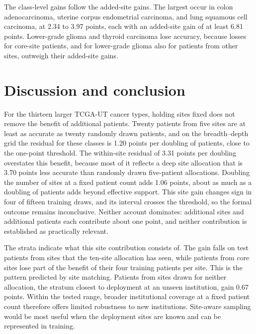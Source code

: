 \noindent The class-level gains follow the added-site gains. The largest occur in colon adenocarcinoma, uterine corpus endometrial carcinoma, and lung squamous cell carcinoma, at 2.34 to 3.97 points, each with an added-site gain of at least 6.81 points. Lower-grade glioma and thyroid carcinoma lose accuracy, because losses for core-site patients, and for lower-grade glioma also for patients from other sites, outweigh their added-site gains.

\section{Discussion and conclusion}
\label{sec:discussion}
For the thirteen larger TCGA-UT cancer types, holding sites fixed does not remove the benefit of additional patients. Twenty patients from five sites are at least as accurate as twenty randomly drawn patients, and on the breadth--depth grid the residual for these classes is 1.20 points per doubling of patients, close to the one-point threshold. The within-site residual of 3.31 points per doubling overstates this benefit, because most of it reflects a deep site allocation that is 3.70 points less accurate than randomly drawn five-patient allocations. Doubling the number of sites at a fixed patient count adds 1.06 points, about as much as a doubling of patients adds beyond effective support. This site gain changes sign in four of fifteen training draws, and its interval crosses the threshold, so the formal outcome remains inconclusive. Neither account dominates: additional sites and additional patients each contribute about one point, and neither contribution is established as practically relevant.

The strata indicate what this site contribution consists of. The gain falls on test patients from sites that the ten-site allocation has seen, while patients from core sites lose part of the benefit of their four training patients per site. This is the pattern predicted by site matching. Patients from sites drawn for neither allocation, the stratum closest to deployment at an unseen institution, gain 0.67 points. Within the tested range, broader institutional coverage at a fixed patient count therefore offers limited robustness to new institutions. Site-aware sampling would be most useful when the deployment sites are known and can be represented in training.

